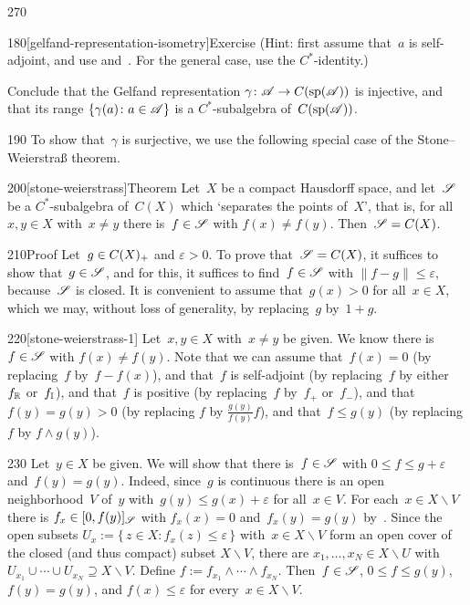 \begin{parsec}{270}
\begin{point}{180}[gelfand-representation-isometry]{Exercise}
(Hint: first assume that~$a$ is self-adjoint,
and use  and~.
For the general case,
use the $C^*$-identity.)

Conclude that the Gelfand representation $\gamma\colon \mathscr{A}\to C(\mathrm{sp}(\mathscr{A}))$
is injective,
and that its range $\{\gamma(a)\colon a\in\mathscr{A}\}$
is a $C^*$-subalgebra of~$C(\mathrm{sp}(\mathscr{A}))$.
\end{point}
\begin{point}{190}%
To show that~$\gamma$ is surjective,
we use the following special case of
the Stone--Weierstra\ss{} theorem.%
\end{point}
\begin{point}{200}[stone-weierstrass]{Theorem}%
Let~$X$ be a compact Hausdorff space,
and let~$\mathscr{S}$ be a $C^*$-subalgebra of~$C(X)$
which `separates the points of~$X$',
that is, for all~$x,y\in X$ with~$x\neq y$
there is~$f\in \mathscr{S}$ with $f(x)\neq f(y)$.
Then~$\mathscr{S}=C(X)$.
\begin{point}{210}{Proof}%
Let~$g\in C(X)_{+}$ and $\varepsilon >0$.
To prove that~$\mathscr{S}=C(X)$,
it suffices to show that~$g\in \mathscr{S}$,
and for this,
it suffices to find~$f\in \mathscr{S}$ with $\|f-g\|\leq \varepsilon$,
because~$\mathscr{S}$ is closed.
It is convenient to assume that~$g(x)> 0$ for all~$x\in X$,
which we may, without loss of generality,
by replacing~$g$ by~$1+g$.

\begin{point}{220}[stone-weierstrass-1]%
Let~$x,y\in X$ with~$x\neq y$
be given.
We know there is~$f\in \mathscr{S}$ with $f(x)\neq f(y)$.
Note that we can assume that~$f(x)=0$ (by replacing~$f$ by~$f-f(x)$),
and that~$f$ is self-adjoint (by replacing~$f$
by either~$f_{\mathbb{R}}$ or~$f_{\mathbb{I}}$),
and that~$f$ is positive
(by replacing~$f$ by~$f_+$ or~$f_-$),
and that~$f(y)=g(y)>0$
(by replacing $f$ by $\frac{g(y)}{f(y)} f$),
and that~$f\leq g(y)$
(by replacing $f$ by $f\wedge g(y)$).
\end{point}
\begin{point}{230}%
Let~$y\in X$ be given.
We will show that there is~$f\in\mathscr{S}$
with $0\leq f\leq g+\varepsilon$
and~$f(y)=g(y)$.
Indeed,
since~$g$ is continuous
there is an open neighborhood~$V$ of~$y$
with~$g(y) \leq  g(x)+\varepsilon$
for all~$x\in V$.
For each~$x\in X\backslash V$ there is $f_x \in [0,f(y)]_{\mathscr{S}}$
with $f_x(x)=0$ and~$f_x(y)=g(y)$ by~.
Since the open subsets
$U_x := \{\,z\in X\colon f_x(z)\leq \varepsilon\,\}$
with~$x\in X\backslash V$
form an open cover of the closed (and thus compact) subset $X\backslash V$,
there are $x_1,\dotsc,x_N\in X\backslash U$
with $U_{x_1}\cup\dotsb\cup U_{x_N}\supseteq X\backslash V$.
Define $f:=f_{x_1}\wedge \dotsb \wedge f_{x_N}$.
Then~$f\in \mathscr{S}$, $0\leq f\leq g(y)$, $f(y)=g(y)$,
and $f(x)\leq \varepsilon$
for every~$x\in X\backslash V$.


\end{point}
\end{point}
\end{point}
\end{parsec}
